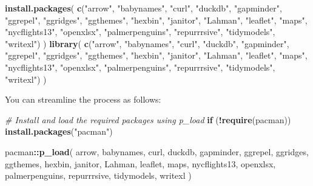 \documentclass[
  12pt,
  oneside]{book}
\newenvironment{Shaded}{\begin{snugshade}}{\end{snugshade}}
\newcommand{\CommentTok}[1]{\textcolor[rgb]{0.56,0.35,0.01}{\textit{#1}}}
\newcommand{\ControlFlowTok}[1]{\textcolor[rgb]{0.13,0.29,0.53}{\textbf{#1}}}
\newcommand{\FunctionTok}[1]{\textcolor[rgb]{0.13,0.29,0.53}{\textbf{#1}}}
\newcommand{\NormalTok}[1]{#1}
\newcommand{\SpecialCharTok}[1]{\textcolor[rgb]{0.81,0.36,0.00}{\textbf{#1}}}
\newcommand{\StringTok}[1]{\textcolor[rgb]{0.31,0.60,0.02}{#1}}
\begin{document}
\begin{Shaded}
\begin{Highlighting}[]
\FunctionTok{install.packages}\NormalTok{(}
  \FunctionTok{c}\NormalTok{(}\StringTok{"arrow"}\NormalTok{, }\StringTok{"babynames"}\NormalTok{, }\StringTok{"curl"}\NormalTok{, }\StringTok{"duckdb"}\NormalTok{, }\StringTok{"gapminder"}\NormalTok{, }
    \StringTok{"ggrepel"}\NormalTok{, }\StringTok{"ggridges"}\NormalTok{, }\StringTok{"ggthemes"}\NormalTok{, }\StringTok{"hexbin"}\NormalTok{, }\StringTok{"janitor"}\NormalTok{, }\StringTok{"Lahman"}\NormalTok{, }
    \StringTok{"leaflet"}\NormalTok{, }\StringTok{"maps"}\NormalTok{, }\StringTok{"nycflights13"}\NormalTok{, }\StringTok{"openxlsx"}\NormalTok{, }\StringTok{"palmerpenguins"}\NormalTok{, }
    \StringTok{"repurrrsive"}\NormalTok{, }\StringTok{"tidymodels"}\NormalTok{, }\StringTok{"writexl"}\NormalTok{)}
\NormalTok{  )}
\FunctionTok{library}\NormalTok{(}
  \FunctionTok{c}\NormalTok{(}\StringTok{"arrow"}\NormalTok{, }\StringTok{"babynames"}\NormalTok{, }\StringTok{"curl"}\NormalTok{, }\StringTok{"duckdb"}\NormalTok{, }\StringTok{"gapminder"}\NormalTok{, }
    \StringTok{"ggrepel"}\NormalTok{, }\StringTok{"ggridges"}\NormalTok{, }\StringTok{"ggthemes"}\NormalTok{, }\StringTok{"hexbin"}\NormalTok{, }\StringTok{"janitor"}\NormalTok{, }\StringTok{"Lahman"}\NormalTok{, }
    \StringTok{"leaflet"}\NormalTok{, }\StringTok{"maps"}\NormalTok{, }\StringTok{"nycflights13"}\NormalTok{, }\StringTok{"openxlsx"}\NormalTok{, }\StringTok{"palmerpenguins"}\NormalTok{, }
    \StringTok{"repurrrsive"}\NormalTok{, }\StringTok{"tidymodels"}\NormalTok{, }\StringTok{"writexl"}\NormalTok{)}
\NormalTok{  )}
\end{Highlighting}
\end{Shaded}

You can streamline the process as follows:

\begin{Shaded}
\begin{Highlighting}[]
\CommentTok{\# Install and load the required packages using p\_load}
\ControlFlowTok{if}\NormalTok{ (}\SpecialCharTok{!}\FunctionTok{require}\NormalTok{(pacman)) }\FunctionTok{install.packages}\NormalTok{(}\StringTok{"pacman"}\NormalTok{)}

\NormalTok{pacman}\SpecialCharTok{::}\FunctionTok{p\_load}\NormalTok{(}
\NormalTok{  arrow, babynames, curl, duckdb, gapminder, }
\NormalTok{  ggrepel, ggridges, ggthemes, hexbin, janitor, Lahman, }
\NormalTok{  leaflet, maps, nycflights13, openxlsx, palmerpenguins, }
\NormalTok{  repurrrsive, tidymodels, writexl}
\NormalTok{)}
\end{Highlighting}
\end{Shaded}
\end{document}
